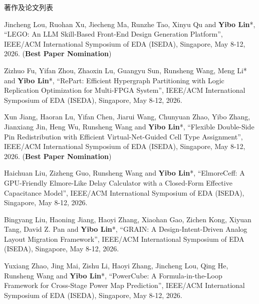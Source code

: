 \begin{rSection}{著作及论文列表}
\begin{description}[font=\normalfont, rightmargin=2em]
{}
            

\item[{[C225]}]{
        Jincheng Lou, Ruohan Xu, Jiecheng Ma, Runzhe Tao, Xinyu Qu and \textbf{Yibo Lin}*, 
    ``LEGO: An LLM Skill-Based Front-End Design Generation Platform'', 
    IEEE/ACM International Symposium of EDA (ISEDA), Singapore, May 8-12, 2026.
    (\textbf{Best Paper Nomination})
}
            

\item[{[C224]}]{
        Zizhuo Fu, Yifan Zhou, Zhaoxin Lu, Guangyu Sun, Runsheng Wang, Meng Li* and \textbf{Yibo Lin}*, 
    ``RePart: Efficient Hypergraph Partitioning with Logic Replication Optimization for Multi-FPGA System'', 
    IEEE/ACM International Symposium of EDA (ISEDA), Singapore, May 8-12, 2026.
    
}
            

\item[{[C223]}]{
        Xun Jiang, Haoran Lu, Yifan Chen, Jiarui Wang, Chunyuan Zhao, Yibo Zhang, Jianxiang Jin, Heng Wu, Runsheng Wang and \textbf{Yibo Lin}*, 
    ``Flexible Double-Side Pin Redistribution with Efficient Virtual-Net-Guided Cell Type Assignment'', 
    IEEE/ACM International Symposium of EDA (ISEDA), Singapore, May 8-12, 2026.
    (\textbf{Best Paper Nomination})
}
            

\item[{[C222]}]{
        Haichuan Liu, Zizheng Guo, Runsheng Wang and \textbf{Yibo Lin}*, 
    ``ElmoreCeff: A GPU-Friendly Elmore-Like Delay Calculator with a Closed-Form Effective Capacitance Model'', 
    IEEE/ACM International Symposium of EDA (ISEDA), Singapore, May 8-12, 2026.
    
}
            

\item[{[C221]}]{
        Bingyang Liu, Haoning Jiang, Haoyi Zhang, Xiaohan Gao, Zichen Kong, Xiyuan Tang, David Z. Pan and \textbf{Yibo Lin}*, 
    ``GRAIN: A Design-Intent-Driven Analog Layout Migration Framework'', 
    IEEE/ACM International Symposium of EDA (ISEDA), Singapore, May 8-12, 2026.
    
}
            

\item[{[C220]}]{
        Yuxiang Zhao, Jing Mai, Zishu Li, Haoyi Zhang, Jincheng Lou, Qing He, Runsheng Wang and \textbf{Yibo Lin}*, 
    ``PowerCube: A Formula-in-the-Loop Framework for Cross-Stage Power Map Prediction'', 
    IEEE/ACM International Symposium of EDA (ISEDA), Singapore, May 8-12, 2026.
    
}
\end{description}
\end{rSection}
